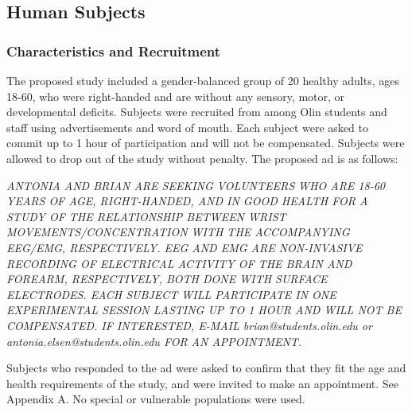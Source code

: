 \documentclass[journal]{IEEEtran}
\begin{document}
\subsection{Human Subjects}
\subsubsection{Characteristics and Recruitment}
The proposed study included a gender-balanced group of 20 healthy adults, ages 18-60, who were right-handed and are without any sensory, motor, or developmental deficits. Subjects were recruited from among Olin students and staff using advertisements and word of mouth. Each subject were asked to commit up to 1 hour of participation and will not be compensated. Subjects were allowed to drop out of the study without penalty.
The proposed ad is as follows: \par

\vspace{5mm}

\scriptsize 
\textit{ANTONIA AND BRIAN ARE SEEKING VOLUNTEERS WHO ARE 18-60 YEARS OF AGE, RIGHT-HANDED, AND IN GOOD HEALTH FOR A STUDY OF THE RELATIONSHIP BETWEEN WRIST MOVEMENTS/CONCENTRATION WITH THE ACCOMPANYING EEG/EMG, RESPECTIVELY. EEG AND EMG ARE NON-INVASIVE RECORDING OF ELECTRICAL ACTIVITY OF THE BRAIN AND FOREARM, RESPECTIVELY, BOTH DONE WITH SURFACE ELECTRODES. EACH SUBJECT WILL PARTICIPATE IN ONE EXPERIMENTAL SESSION LASTING UP TO 1 HOUR AND WILL NOT BE COMPENSATED. IF INTERESTED, E-MAIL brian@students.olin.edu or antonia.elsen@students.olin.edu FOR AN APPOINTMENT.} 

\vspace{5mm}
\normalsize Subjects who responded to the ad were asked to confirm that they fit the age and health requirements of the study, and were invited to make an appointment. See Appendix A. No special or vulnerable populations were used.
\end{document}
